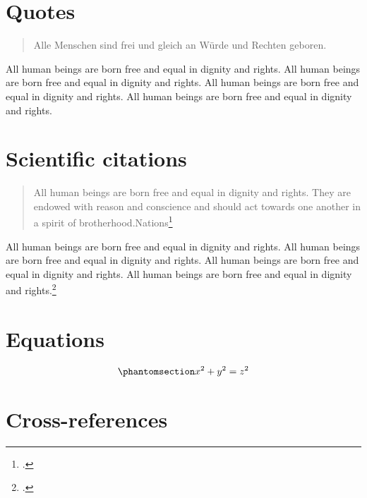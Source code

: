\documentclass[
  titlepage,
  openright,
  DIV=calc,
  toc=listof,
  listof=nochaptergap]{scrbook}
\begin{document}
\section{Quotes}\label{quotes}

\begin{otherlanguage}{ngerman}

\begin{quote}
Alle Menschen sind frei und gleich an Würde und Rechten geboren.
\end{quote}

\end{otherlanguage}

All human beings are born free and equal in dignity and rights. All
human beings are born free and equal in dignity and rights. All human
beings are born free and equal in dignity and rights. All human beings
are born free and equal in dignity and rights.

\section{Scientific citations}\label{scientific-citations}

\begin{quote}
All human beings are born free and equal in dignity and rights. They are
endowed with reason and conscience and should act towards one another in
a spirit of brotherhood.Nations\footnote{.}
\end{quote}

All human beings are born free and equal in dignity and rights. All
human beings are born free and equal in dignity and rights. All human
beings are born free and equal in dignity and rights. All human beings
are born free and equal in dignity and rights.\footnote{.}

\section{Equations}\label{equations}

\begin{equation}\phantomsection\label{eq:pythagoras}{x^2 + y^2 = z^2}\end{equation}

\section{Cross-references}\label{cross-references}
\end{document}
